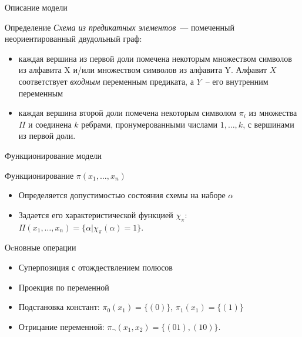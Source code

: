 \documentclass{beamer}
\begin{document}
\begin{frame}{Описание модели}

    \begin{block}{Определение}
        \textit{Схема из предикатных элементов}~--- помеченный
         неориентированный двудольный граф:

        \begin{itemize}
            \item каждая вершина из первой доли помечена некоторым множеством символов из алфавита X и/или 
             множеством символов из алфавита Y. 
             Алфавит $X$ соответствует \textit{входным} переменным предиката, а $Y$~-- его внутренним переменным 

            \item каждая вершина второй доли помечена некоторым символом $\pi_i$ из множества $\Pi$ и 
            соединена $k$ ребрами, пронумерованными числами $1, \dots, k$, с вершинами из первой доли.
        \end{itemize}
    \end{block}
\end{frame}

\begin{frame}{Функционирование модели} 

    \begin{block}{Функционирование $\pi(x_1, \dots, x_n)$}
    \begin{itemize}
            \item Определяется допустимостью состояния схемы на наборе $\alpha$
            \item Задается его характеристической функцией $\chi_{\pi}$: 
                  $\Pi(x_1, \dots, x_n) = \{ \alpha | \chi_{\pi}(\alpha) = 1 \}$.
         \end{itemize}
    \end{block}

    \begin{block}{Оcновные операции}
        \begin{itemize}
            \item Суперпозиция с отождествлением полюсов
            \item Проекция по переменной
            \item Подстановка констант: $\pi_0(x_1)=\{ (0) \}$, $\pi_1(x_1)=\{ (1) \}$
            \item Отрицание переменной: $\pi_{\neg}(x_1, x_2)=\{ (01), (10) \}$.
        \end{itemize}
    \end{block}
\end{frame}
\end{document}
